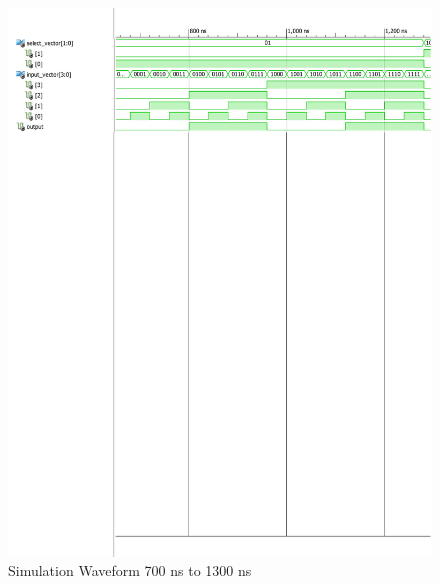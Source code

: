 \documentclass{article}
\begin{document}
\begin{figure}[H]
    \centering
    \includegraphics[scale=0.75,cframe=blue 0.5pt 3pt]{6aw-2.pdf}
    \caption{Simulation Waveform 700 ns to 1300 ns }
\end{figure}
\end{document}
